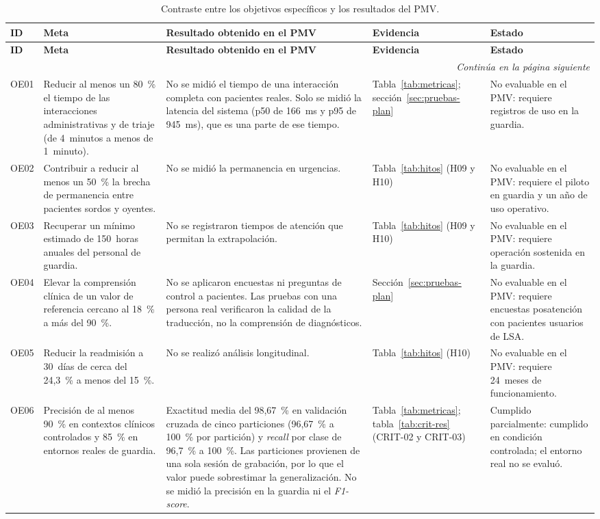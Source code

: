 {\footnotesize
\setlength{\tabcolsep}{3pt}
\begin{longtable}{@{}p{0.9cm}p{3.3cm}p{5.0cm}p{2.7cm}p{3.1cm}@{}}
\caption{Contraste entre los objetivos específicos y los resultados del PMV.}\label{tab:res-objetivos}\\
\toprule
\textbf{ID} & \textbf{Meta} & \textbf{Resultado obtenido en el PMV} & \textbf{Evidencia} & \textbf{Estado} \\
\midrule
\endfirsthead
\toprule
\textbf{ID} & \textbf{Meta} & \textbf{Resultado obtenido en el PMV} & \textbf{Evidencia} & \textbf{Estado} \\
\midrule
\endhead
\midrule
\multicolumn{5}{r}{\emph{Continúa en la página siguiente}}\\
\endfoot
\bottomrule
\endlastfoot
OE01 & Reducir al menos un 80~\% el tiempo de las interacciones administrativas y de triaje (de 4~minutos a menos de 1~minuto). & No se midió el tiempo de una interacción completa con pacientes reales. Solo se midió la latencia del sistema (p50 de 166~ms y p95 de 945~ms), que es una parte de ese tiempo. & Tabla~\ref{tab:metricas}; sección~\ref{sec:pruebas-plan} & No evaluable en el PMV: requiere registros de uso en la guardia. \\
OE02 & Contribuir a reducir al menos un 50~\% la brecha de permanencia entre pacientes sordos y oyentes. & No se midió la permanencia en urgencias. & Tabla~\ref{tab:hitos} (H09 y H10) & No evaluable en el PMV: requiere el piloto en guardia y un año de uso operativo. \\
OE03 & Recuperar un mínimo estimado de 150~horas anuales del personal de guardia. & No se registraron tiempos de atención que permitan la extrapolación. & Tabla~\ref{tab:hitos} (H09 y H10) & No evaluable en el PMV: requiere operación sostenida en la guardia. \\
OE04 & Elevar la comprensión clínica de un valor de referencia cercano al 18~\% a más del 90~\%. & No se aplicaron encuestas ni preguntas de control a pacientes. Las pruebas con una persona real verificaron la calidad de la traducción, no la comprensión de diagnósticos. & Sección~\ref{sec:pruebas-plan} & No evaluable en el PMV: requiere encuestas posatención con pacientes usuarios de LSA. \\
OE05 & Reducir la readmisión a 30~días de cerca del 24,3~\% a menos del 15~\%. & No se realizó análisis longitudinal. & Tabla~\ref{tab:hitos} (H10) & No evaluable en el PMV: requiere 24~meses de funcionamiento. \\
OE06 & Precisión de al menos 90~\% en contextos clínicos controlados y 85~\% en entornos reales de guardia. & Exactitud media del 98,67~\% en validación cruzada de cinco particiones (96,67~\% a 100~\% por partición) y \emph{recall} por clase de 96,7~\% a 100~\%. Las particiones provienen de una sola sesión de grabación, por lo que el valor puede sobrestimar la generalización. No se midió la precisión en la guardia ni el \emph{F1-score}. & Tabla~\ref{tab:metricas}; tabla~\ref{tab:crit-res} (CRIT-02 y CRIT-03) & Cumplido parcialmente: cumplido en condición controlada; el entorno real no se evaluó. \\

\end{longtable}}
